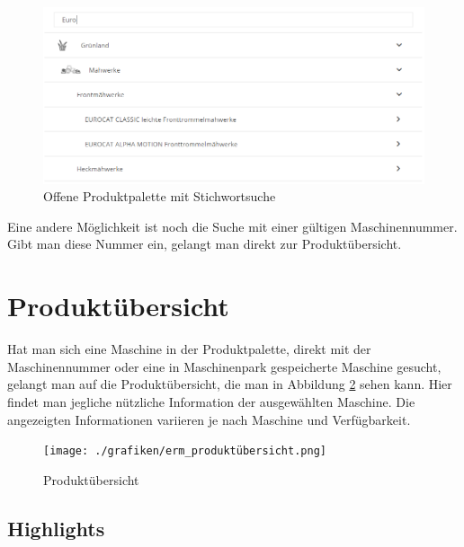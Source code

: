 \begin{figure}[H]
	\centerline{
		\includegraphics[width=1\textwidth, frame]{./grafiken/erm_produktpalette_offen_stichwort.PNG}
	}
	\vskip0pt
	\caption{Offene Produktpalette mit Stichwortsuche} \label{fig:produktpaletteMitStichwort}
\end{figure}

Eine andere Möglichkeit ist noch die Suche mit einer gültigen Maschinennummer. Gibt man diese Nummer ein, gelangt man direkt zur Produktübersicht.

\section{Produktübersicht}

Hat man sich eine Maschine in der Produktpalette, direkt mit der Maschinennummer oder eine in Maschinenpark gespeicherte Maschine gesucht, gelangt man auf die Produktübersicht, die man in Abbildung \ref{fig:produktübersicht} sehen kann. Hier findet man jegliche nützliche Information der ausgewählten Maschine. Die angezeigten Informationen variieren je nach Maschine und Verfügbarkeit.

\begin{figure}[H]
	\centerline{
		\texttt{[image: ./grafiken/erm\_produktübersicht.png]}
	}
	\vskip0pt
	\caption{Produktübersicht} \label{fig:produktübersicht}
\end{figure}

\subsection{Highlights}


